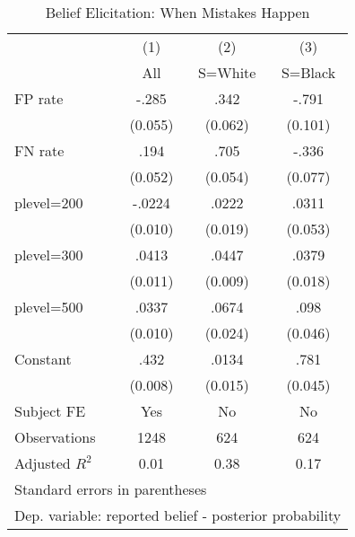 \begin{table}[htbp]\centering
\caption{Belief Elicitation: When Mistakes Happen}
\begin{tabular}{l*{3}{c}}
\hline\hline
                &\multicolumn{1}{c}{(1)}&\multicolumn{1}{c}{(2)}&\multicolumn{1}{c}{(3)}\\
                &\multicolumn{1}{c}{All}&\multicolumn{1}{c}{S=White}&\multicolumn{1}{c}{S=Black}\\
\hline
FP rate         &    -.285&     .342&    -.791\\
                &  (0.055)&  (0.062)&  (0.101)\\
FN rate         &     .194&     .705&    -.336\\
                &  (0.052)&  (0.054)&  (0.077)\\
plevel=200      &   -.0224&    .0222&    .0311\\
                &  (0.010)&  (0.019)&  (0.053)\\
plevel=300      &    .0413&    .0447&    .0379\\
                &  (0.011)&  (0.009)&  (0.018)\\
plevel=500      &    .0337&    .0674&     .098\\
                &  (0.010)&  (0.024)&  (0.046)\\
Constant        &     .432&    .0134&     .781\\
                &  (0.008)&  (0.015)&  (0.045)\\
Subject FE      &      Yes&       No&       No\\
\hline
Observations    &     1248&      624&      624\\
Adjusted \(R^{2}\)&     0.01&     0.38&     0.17\\
\hline\hline
\multicolumn{4}{l}{\footnotesize Standard errors in parentheses}\\
\multicolumn{4}{l}{\footnotesize Dep. variable: reported belief - posterior probability}\\
\end{tabular}
\end{table}
